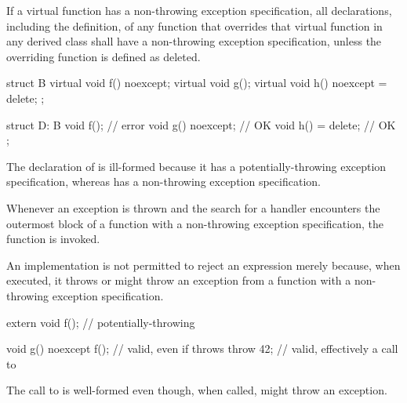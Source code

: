 \pnum
{}%
If a virtual function has a
non-throwing exception specification,
all declarations, including the definition, of any function
that overrides that virtual function in any derived class
shall have a non-throwing
exception specification,
unless the overriding function is defined as deleted.
\begin{example}
\begin{codeblock}
struct B {
  virtual void f() noexcept;
  virtual void g();
  virtual void h() noexcept = delete;
};

struct D: B {
  void f();                     // error
  void g() noexcept;            // OK
  void h() = delete;            // OK
};
\end{codeblock}

The declaration of
is ill-formed because it
has a potentially-throwing exception specification,
whereas
has a non-throwing exception specification.
\end{example}

\pnum
{}%
%
Whenever an exception is thrown
and the search for a handler
encounters the outermost block of a function with a
non-throwing exception specification,
the function  is invoked.
\begin{note}
An implementation is not permitted to reject an expression merely because, when
executed, it throws or might
throw an exception from a function with a non-throwing exception specification.
\end{note}
\begin{example}
\begin{codeblock}
extern void f();                // potentially-throwing

void g() noexcept {
  f();                          // valid, even if  throws
  throw 42;                     // valid, effectively a call to 
}
\end{codeblock}
The call to
is well-formed even though, when called,
might throw an exception.
\end{example}

